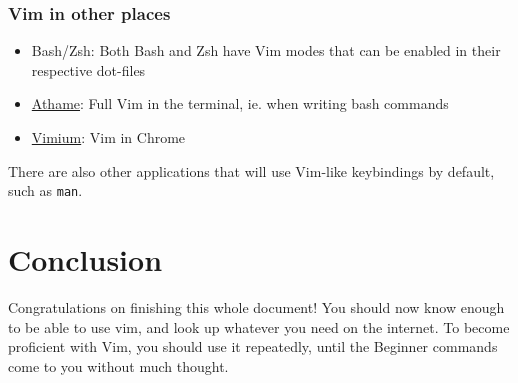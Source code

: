 \documentclass[11pt]{article}
\begin{document}
\subsubsection{Vim in other places}
\label{sec:orgaf888fa}
\begin{itemize}
\item Bash/Zsh: Both Bash and Zsh have Vim modes that can be enabled in their respective dot-files
\item \href{https://github.com/ardagnir/athame}{Athame}: Full Vim in the terminal, ie. when writing bash commands
\item \href{https://chrome.google.com/webstore/detail/vimium/dbepggeogbaibhgnhhndojpepiihcmeb}{Vimium}: Vim in Chrome
\end{itemize}

There are also other applications that will use Vim-like keybindings by default,
such as \texttt{man}.
\section{Conclusion}
\label{sec:orgd6688cd}
Congratulations on finishing this whole document! You should now know enough to
be able to use vim, and look up whatever you need on the internet. To become
proficient with Vim, you should use it repeatedly, until the Beginner commands
come to you without much thought.
\end{document}
